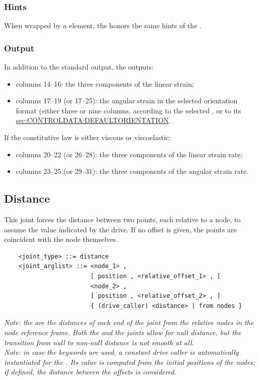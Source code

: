 \subsubsection{Hints}
When wrapped by a  element, the 
honors the same hints of the .

\subsubsection{Output}
In addition to the standard output, the 
outputs:
\begin{itemize}
\item columns 14--16: the three components of the linear strain;
\item columns 17--19 (or 17--25): the angular strain
in the selected orientation format (either three or nine columns,
according to the selected , or to its 
\hyperref{default value)}{default value, see Section~}{)}{sec:CONTROLDATA:DEFAULTORIENTATION}.
\end{itemize}
If the constitutive law is either viscous or viscoelastic:
\begin{itemize}
\item columns 20--22 (or 26--28): the three components
of the linear strain rate;
\item columns 23--25 (or 29--31): the three components
of the angular strain rate.
\end{itemize}




\subsection{Distance}
This joint forces the distance between two points,
each relative to a node, to assume the value indicated by the drive.
If no offset is given, the points are coincident with the node themselves.
\begin{verbatim}
    <joint_type> ::= distance 
    <joint_arglist> ::= <node_1> , 
                        [ position , <relative_offset_1> , ]
                        <node_2> ,
                        [ position , <relative_offset_2> , ]
                        { (drive_caller) <distance> | from nodes }
\end{verbatim}

\noindent
{\em 
    Note: the  are the distances of each end
    of the joint from the relative nodes in the node reference frame.
    Both the  and the  joints
    allow for null distance, but the transition from null to non-null
    distance is not smooth at all.
} \\
{\em
    Note: in case the keywords  are used, a constant drive
    caller is automatically instantiated for the . 
    Its value is computed from the initial positions of the nodes;
    if defined, the distance between the offsets is considered. 
}

